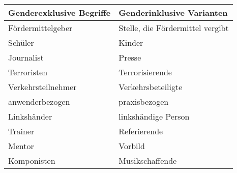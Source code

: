 
\begin{tabular}{ll}
\toprule
Genderexklusive Begriffe & Genderinklusive Varianten\\
\midrule
Fördermittelgeber & Stelle, die Fördermittel vergibt\\
Schüler & Kinder\\
Journalist & Presse\\
Terroristen & Terrorisierende\\
Verkehrsteilnehmer & Verkehrsbeteiligte\\
anwenderbezogen & praxisbezogen\\
Linkshänder & linkshändige Person\\
Trainer & Referierende\\
Mentor & Vorbild\\
Komponisten & Musikschaffende\\
\bottomrule
\end{tabular}